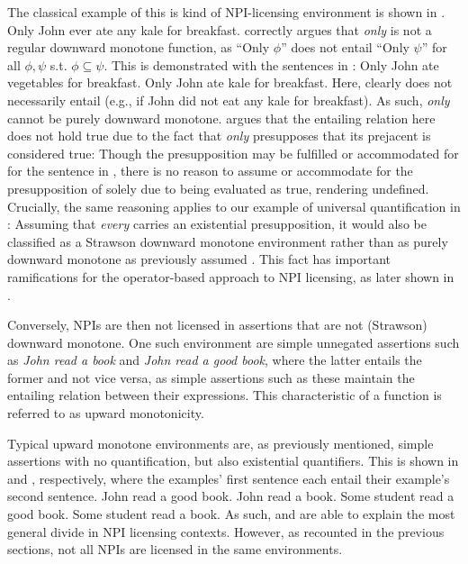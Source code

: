 \ex\label{def:sdm}%
%
\xe
The classical example of this is kind of NPI-licensing environment is shown in .
\ex
Only John ever ate any kale for breakfast.\hfill\parencite[p.~101]{Fintel1999}
\xe
\textcite{Fintel1999} correctly argues that \textit{only} is not a regular downward monotone function, as \enquote{Only $\phi$} does not entail \enquote{Only $\psi$} for all $\phi,\psi$ s.t. $\phi\subseteq\psi$. This is demonstrated with the sentences in :
\pex\label{ex:only-dm}
\a Only John ate vegetables for breakfast.
\a Only John ate kale for breakfast.
\xe
Here,  clearly does not necessarily entail  (e.g., if John did not eat any kale for breakfast). As such, \textit{only} cannot be purely downward monotone. \textcite{Fintel1999} argues that the entailing relation here does not hold true due to the fact that \textit{only} presupposes that its prejacent is considered true: Though the presupposition may be fulfilled or accommodated for for the sentence in , there is no reason to assume or accommodate for the presupposition of  solely due to  being evaluated as true, rendering  undefined. Crucially, the same reasoning applies to our example of universal quantification in : Assuming that \textit{every} carries an existential presupposition, it would also be classified as a Strawson downward monotone environment \parencite{Fintel1999} rather than as purely downward monotone as previously assumed \parencite{Fauconnier1975a,Fauconnier1975b,Ladusaw1980}. This fact has important ramifications for the operator-based approach to NPI licensing, as later shown in .



Conversely, NPIs are then not licensed in assertions that are not (Strawson) downward monotone. One such environment are simple unnegated assertions such as \textit{John read a book} and \textit{John read a good book}, where the latter entails the former and not vice versa, as simple assertions such as these maintain the entailing relation between their expressions. This characteristic of a function is referred to as upward monotonicity.
\ex\label{def:um}%

\xe
Typical upward monotone environments are, as previously mentioned, simple assertions with no quantification, but also existential quantifiers. This is shown in  and , respectively, where the examples' first sentence each entail their example's second sentence.
\pex\label{ex:um-ass}
\a John read a good book.
\a John read a book.
\xe
\pex\label{ex:um-some}
\a Some student read a good book.
\a Some student read a book.
\xe
As such, \textcite{Fauconnier1975a,Fauconnier1975b} and \textcite{Ladusaw1980} are able to explain the most general divide in NPI licensing contexts. However, as recounted in the previous sections, not all NPIs are licensed in the same environments. 

